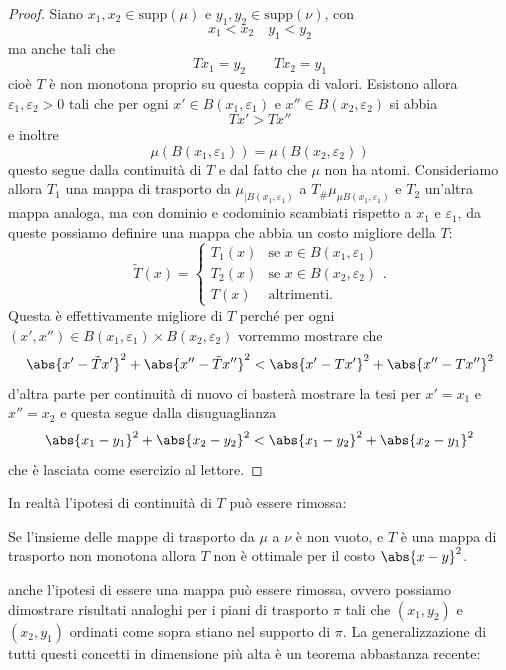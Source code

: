 \documentclass[11pt]{scrartcl}
\begin{document}
	\begin{proof}
		Siano $x_1,x_2\in \text{supp}(\mu)$ e $y_1,y_2\in \text{supp}(\nu)$, con 
		$$x_1<x_2 \quad y_1<y_2$$
		ma anche tali che 
		$$Tx_1=y_2 \qquad Tx_2=y_1$$
		cioè $T$ è non monotona proprio su questa coppia di valori. Esistono allora $\varepsilon_1,\varepsilon_2>0$ tali che per ogni $x'\in B(x_1,\varepsilon_1)$ e $x''\in B(x_2,\varepsilon_2)$ si abbia
		$$Tx'>Tx''$$
		e inoltre 
		$$\mu(B(x_1,\varepsilon_1))=\mu(B(x_2,\varepsilon_2))$$
		questo segue dalla continuità di $T$ e dal fatto che $\mu$ non ha atomi. Consideriamo allora $T_1$ una mappa di trasporto da $\mu_{\mid B(x_1,\varepsilon_1)}$ a $T_\#\mu_{\mu B(x_1,\varepsilon_1)}$ e $T_2$ un'altra mappa analoga, ma con dominio e codominio scambiati rispetto a $x_1$ e $\varepsilon_1$, da queste possiamo definire una mappa che abbia un costo migliore della $T$:
		$$
		\tilde{T}(x)=
		\begin{cases}
			T_1(x) & \text{se $x\in B(x_1,\varepsilon_1)$} \\
			T_2(x) & \text{se $x\in B(x_2,\varepsilon_2)$} \\
			T(x) & \text{altrimenti.}
		\end{cases}.
		$$
		Questa è effettivamente migliore di $T$ perché per ogni $(x',x'')\in B(x_1,\varepsilon_1)\times B(x_2,\varepsilon_2)$ vorremmo mostrare che
		$$\abs{x'-\tilde{T}x'}^2+\abs{x''-\tilde{T}x''}^2<\abs{x'-Tx'}^2+\abs{x''-Tx''}^2$$
		d'altra parte per continuità di nuovo ci basterà mostrare la tesi per $x'=x_1$ e $x''=x_2$ e questa segue dalla disuguaglianza
		$$\abs{x_1-y_1}^2+\abs{x_2-y_2}^2<\abs{x_1-y_2}^2+\abs{x_2-y_1}^2$$
		che è lasciata come esercizio al lettore.
	\end{proof}
	In realtà l'ipotesi di continuità di $T$ può essere rimossa:
	\begin{proposition}
		Se l'insieme delle mappe di trasporto da $\mu$ a $\nu$ è non vuoto, e $T$ è una mappa di trasporto non monotona allora $T$ non è ottimale per il costo $\abs{x-y}^2$.
	\end{proposition}
	anche l'ipotesi di essere una mappa può essere rimossa, ovvero possiamo dimostrare risultati analoghi per i piani di trasporto $\pi$ tali che $(x_1,y_2)$ e $(x_2,y_1)$ ordinati come sopra stiano nel supporto di $\pi$. La generalizzazione di tutti questi concetti in dimensione più alta è un teorema abbastanza recente:
\end{document}
